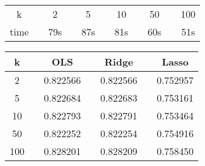 \begin{center}
\label{tab:all-time-k-fold}
\begin{tabularx}{\textwidth}{c X c X c X c X c X c}
    \hline
    \hline
        k    	&& 2 	&& 5 	&& 10 	&& 50 	&& 100\\
        time  	&& 79s	&& 87s 	&& 81s	&& 60s	&& 51s\\
    \hline
\end{tabularx}
\end{center}


\begin{center}
\label{tab:all-R2-k-fold}
\begin{tabularx}{\textwidth}{c X c X c X c}
    \hline
    \hline
        k    	&& OLS 	    && Ridge 	&& Lasso\\
    \hline
        2     	&& 0.822566	&& 0.822566	&& 0.752957\\
        5     	&& 0.822684	&& 0.822683	&& 0.753161\\
        10     	&& 0.822793	&& 0.822791	&& 0.753464\\
        50     	&& 0.822252	&& 0.822254	&& 0.754916\\
        100     && 0.828201	&& 0.828209	&& 0.758450\\
    \hline
\end{tabularx}
\end{center}
